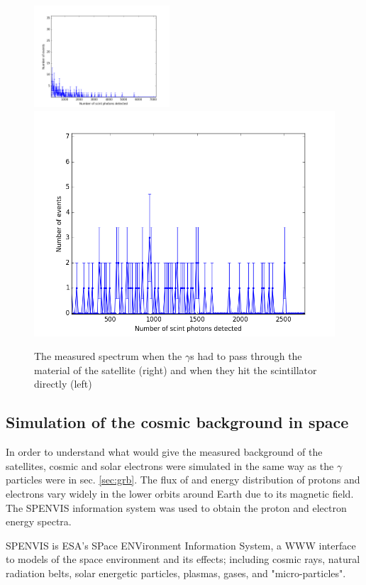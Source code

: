 \documentclass[12pt, a4paper,titlepage]{article}
\numberwithin{equation}{section}
\numberwithin{figure}{section}
\begin{document}
\begin{figure}[htbp]
 \centering %
 \includegraphics[width=0.45\textwidth,origin=c,angle=0]{images/gamma0mac.png}
 \qquad
 \includegraphics[width=.45\textwidth,origin=c]{images/gamma17mac.png} 
 \caption{The measured spectrum when the $\gamma$s had to pass through the material of the satellite (right) and when they hit the scintillator directly (left)  \label{fig:mac17hits}}
 \end{figure}


\subsection{Simulation of the cosmic background in space}

In order to understand what would give the measured background of the satellites, cosmic and solar electrons were simulated in the same way as the $\gamma$ particles were in sec. \ref{sec:grb}. The flux of and energy distribution of protons and electrons vary widely in the lower orbits around Earth due to its magnetic field. The SPENVIS \cite{spenvis} information system was used to obtain the proton and electron energy spectra.

SPENVIS is ESA's SPace ENVironment Information System, a WWW interface to models of the space environment and its effects; including cosmic rays, natural radiation belts, solar energetic particles, plasmas, gases, and "micro-particles".
\end{document}
